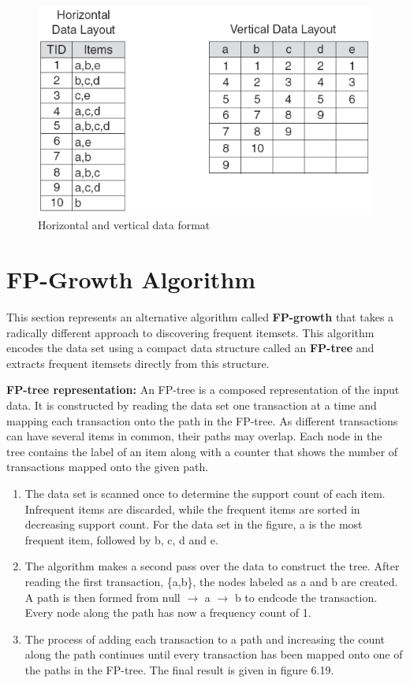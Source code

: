  		\begin{figure}[H]
 				\centering
 				\includegraphics[scale=0.5]{pics/horizontal.png}
 				\caption{Horizontal and vertical data format}
 		\end{figure}

 	\clearpage
 	\section{FP-Growth Algorithm}

 		This section represents an alternative algorithm called {\bf FP-growth} that takes
 		a radically different approach to discovering frequent itemsets. This algorithm
 		encodes the data set using a compact data structure called an {\bf FP-tree} and
 		extracts frequent itemsets directly from this structure. 

 		{\bf FP-tree representation:} An FP-tree is a composed representation of the input data.
 		It is constructed by reading the data set one transaction at a time and mapping each
 		transaction onto the path in the FP-tree. As different transactions can have several items 
 		in common, their paths may overlap. 
 		Each node in the tree contains the label of an item along with a counter that shows
 		the number of transactions mapped onto the given path. 

 		\begin{enumerate}
 			\item The data set is scanned once to determine the support count of each item.
 			Infrequent items are discarded, while the frequent items  are sorted in decreasing
 			support count. For the data set in the figure, a is the most frequent item, 
 			followed by b, c, d and e.
 			\item The algorithm makes a second pass over the data to construct the tree.
 			After reading the first transaction, \{a,b\}, the nodes labeled as a and b are created.
 			A path is then formed from null $\rightarrow$ a $\rightarrow$ b to endcode
 			the transaction. Every node along the path has now a frequency count of 1.
 			\item The process of adding each transaction to a path and increasing the count along
 			the path continues until every transaction has been mapped onto one of the paths in the 
 			FP-tree. The final result is given in figure 6.19. 
 		\end{enumerate}
 		
